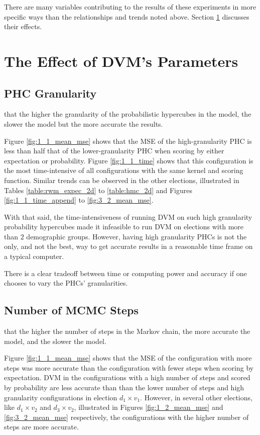 There are many variables contributing to the results of these experiments in more specific ways than the relationships and trends noted above. Section \ref{sec:params} discusses their effects.

\section{The Effect of DVM's Parameters}
\label{sec:params}

\subsection{PHC Granularity}

 that the higher the granularity of the probabilistic hypercubes in the model, the slower the model but the more accurate the results.

Figure \ref{fig:1_1_mean_mse} shows that the MSE of the high-granularity PHC is less than half that of the lower-granularity PHC when scoring by either expectation or probability. Figure \ref{fig:1_1_time} shows that this configuration is the most time-intensive of all configurations with the same kernel and scoring function. Similar trends can be observed in the other elections, illustrated in Tables \ref{table:rwm_expec_2d} to \ref{table:hmc_2d} and Figures \ref{fig:1_1_time_append} to \ref{fig:3_2_mean_mse}.

With that said, the time-intensiveness of running DVM on such high granularity probability hypercubes made it infeasible to run DVM on elections with more than  $2$ demographic groups. However, having high granularity PHCs is not the only, and not the best, way to get accurate results in a reasonable time frame on a typical computer.

There is a clear tradeoff between time or computing power and accuracy if one chooses to vary the PHCs' granularities.

\subsection{Number of MCMC Steps}

 that the higher the number of steps in the Markov chain, the more accurate the model, and the slower the model.

Figure \ref{fig:1_1_mean_mse} shows that the MSE of the configuration with more steps was more accurate than the configuration with fewer steps when scoring by expectation. DVM in the configurations with a high number of steps and scored by probability are less accurate than than the lower number of steps and high granularity configurations in election $d_1 \times v_1$. However, in several other elections, like $d_1 \times v_2$ and $d_3 \times v_2$, illustrated in Figures \ref{fig:1_2_mean_mse} and \ref{fig:3_2_mean_mse} respectively, the configurations with the higher number of steps are more accurate.

